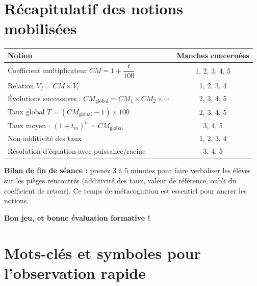 \documentclass[12pt,a4paper]{article}
\begin{document}
\vspace{0.6cm}

\section*{Récapitulatif des notions mobilisées}

\begin{center}
\renewcommand{\arraystretch}{1.5}
\begin{tabular}{|>{\raggedright\arraybackslash}p{7cm}|c|}
\hline
\textbf{Notion} & \textbf{Manches concernées} \\
\hline
Coefficient multiplicateur \(CM = 1 + \dfrac{t}{100}\) & 1, 2, 3, 4, 5 \\
\hline
Relation \(V_f = CM \times V_i\) & 1, 2, 3, 4 \\
\hline
Évolutions successives : \(CM_{\text{global}} = CM_1 \times CM_2 \times \cdots\) & 2, 3, 4, 5 \\
\hline
Taux global \(T = (CM_{\text{global}} - 1) \times 100\) & 2, 3, 4, 5 \\
\hline
Taux moyen : \((1+t_m)^n = CM_{\text{global}}\) & 3, 4, 5 \\
\hline
Non-additivité des taux & 1, 2, 3, 4 \\
\hline
Résolution d'équation avec puissance/racine & 3, 4, 5 \\
\hline
\end{tabular}
\end{center}

\vspace{0.6cm}

\begin{conseil}
\textbf{Bilan de fin de séance :} prenez 3 à 5 minutes pour faire verbaliser les élèves sur les pièges rencontrés (additivité des taux, valeur de référence, oubli du coefficient de retour). Ce temps de métacognition est essentiel pour ancrer les notions.
\end{conseil}

\vspace{0.8cm}

\begin{center}
{\Large\bfseries\color{bleufonce} Bon jeu, et bonne évaluation formative !}
\end{center}
\newpage

\section*{Mots-clés et symboles pour l'observation rapide}
\end{document}
